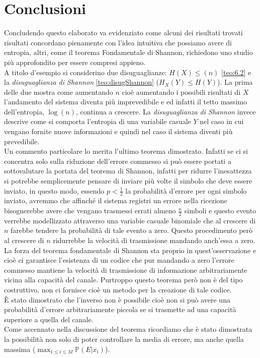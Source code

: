 \chapter{Conclusioni}
\label{cha:conclusioni}
Concludendo questo elaborato va evidenziato come alcuni dei risultati trovati risultati concordano pienamente con l'idea intuitiva che possiamo avere di entropia, altri, come il teorema Fondamentale di Shannon, richiedono uno studio più approfondito per essere compresi appieno.\\
A titolo d'esempio si considerino due disuguaglianze: $H(X)\leq(n)$ \ref{teo:6.2} e la \textit{disuguaglianza di Shannon} \ref{teo:disugShannon} ($H_X(Y)\leq H(Y)$). La prima delle due mostra come aumentando $n$ cioè aumentando i possibili risultati di $X$ l'andamento  del sistema diventa più imprevedibile e ed infatti il tetto massimo dell'entropia, $\log(n)$, continua a crescere. La \textit{disuguaglianza di Shannon} invece descrive come si comporta l'entropia di una variabile casuale $Y$ nel caso in cui vengano fornite nuove informazioni e quindi nel caso il sistema diventi più prevedibile.\\ 
Un commento particolare lo merita l'ultimo teorema dimostrato. Infatti se ci si concentra solo sulla riduzione dell'errore commesso si può essere portati a sottovalutare la portata del teorema di Shannon, infatti per ridurre l'inesattezza si potrebbe semplicemente pensare di inviare più volte il simbolo che deve essere inviato, in questo modo, essendo $p<\frac{1}{2}$ la probabilità d'errore per ogni simbolo inviato, avremmo che affinché il sistema registri un errore nella ricezione bisognerebbe avere che vengano trasmessi errati almeno $\frac{n}{2}$ simboli e questo evento verrebbe modellizzato attraverso una variabie casuale binomiale che al crescere di $n$ farebbe tendere la probabilità di tale evento a zero. Questo procedimento però al crescere di $n$ ridurrebbe la velocità di trasmissione mandando anch'essa a zero. La forza del teorema fondamentale di Shannon sta proprio in quest'osservazione e cioè ci garantisce l'esistenza di un codice che pur mandando a zero l'errore commesso mantiene la velocità di trasmissione di informazione arbitrariamente vicina alla capacità del canale. Purtroppo questo teorema però non è del tipo costruttivo, non ci fornisce cioè un metodo per la creazione di tale codice.\\
È stato dimostrato che l'inverso non è possibile cioè non si può avere una probabilità d'errore arbitrariamente piccola se si trasmette ad una capacità superiore a quella del canale.\\
Come accennato nella discussione del teorema ricordiamo che  è stato dimostrata la possibilità non solo di poter controllare la media di errore, ma anche quella massima ($\max_{1\leq i \leq M} \mathbb{P}(E|x_i)$).\\







